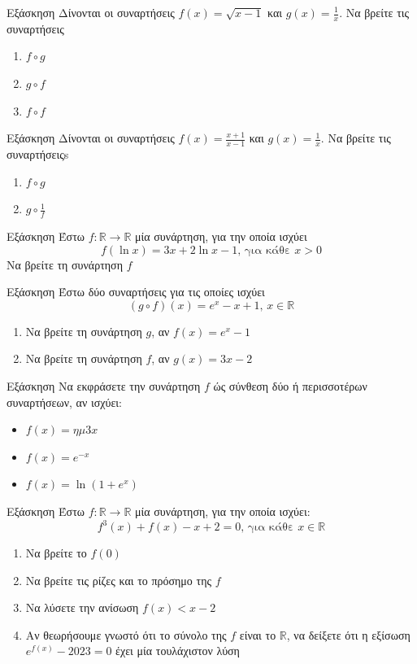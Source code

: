 \documentclass[greek]{beamer}
\begin{document}
\begin{frame}{Εξάσκηση}
 Δίνονται οι συναρτήσεις $f(x)=\sqrt{x-1}$ και $g(x)=\frac{1}{x}$. Να βρείτε τις συναρτήσεις
 \begin{enumerate}
  \item<1-> $f\circ g$
  \item<2-> $g\circ f$
  \item<3-> $f\circ f$
 \end{enumerate}
\end{frame}

\begin{frame}{Εξάσκηση}
 Δίνονται οι συναρτήσεις $f(x)=\frac{x+1}{x-1}$ και $g(x)=\frac{1}{x}$. Να βρείτε τις συναρτήσειςs
 \begin{enumerate}
  \item<1-> $f\circ g$
  \item<2-> $g\circ \frac{1}{f}$
 \end{enumerate}
\end{frame}

\begin{frame}{Εξάσκηση}
 Έστω $f:\mathbb{R}\to\mathbb{R}$ μία συνάρτηση, για την οποία ισχύει
 $$f(\ln x)=3x+2\ln x -1\text{, για κάθε } x>0$$
 Να βρείτε τη συνάρτηση $f$
\end{frame}

\begin{frame}{Εξάσκηση}
 Έστω δύο συναρτήσεις για τις οποίες ισχύει
 $$(g\circ f)(x)=e^x-x+1\text{, } x\in\mathbb{R}$$
 \begin{enumerate}
  \item<1-> Να βρείτε τη συνάρτηση $g$, αν $f(x)=e^x-1$
  \item<2-> Να βρείτε τη συνάρτηση $f$, αν $g(x)=3x-2$
 \end{enumerate}
\end{frame}

\begin{frame}{Εξάσκηση}
 Να εκφράσετε την συνάρτηση $f$ ώς σύνθεση δύο ή περισσοτέρων συναρτήσεων, αν ισχύει:
 \begin{itemize}
  \item $f(x)=ημ 3x$
  \item $f(x)=e^{-x}$
  \item $f(x)=\ln (1+e^x)$
 \end{itemize}
\end{frame}

\begin{frame}{Εξάσκηση}
 Έστω $f:\mathbb{R}\to\mathbb{R}$ μία συνάρτηση, για την οποία ισχύει:
 $$f^3(x)+f(x)-x+2=0\text{, για κάθε } x\in\mathbb{R}$$
 \begin{enumerate}
  \item<1-> Να βρείτε το $f(0)$
  \item<2-> Να βρείτε τις ρίζες και το πρόσημο της $f$
  \item<3-> Να λύσετε την ανίσωση $f(x)<x-2$
  \item<4-> Αν θεωρήσουμε γνωστό ότι το σύνολο της $f$ είναι το $\mathbb{R}$, να δείξετε ότι η εξίσωση $e^{f(x)}-2023=0$ έχει μία τουλάχιστον λύση
 \end{enumerate}
\end{frame}
\end{document}

